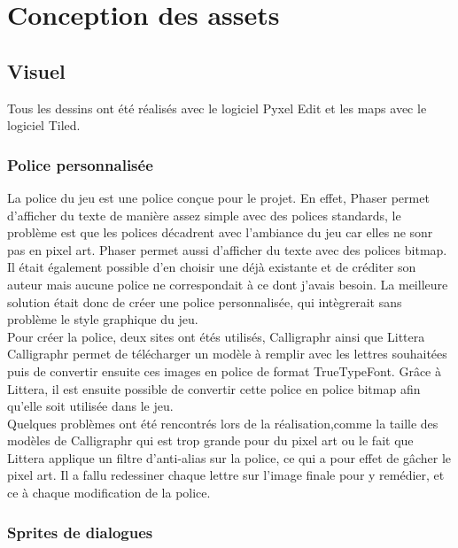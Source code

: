 \documentclass[11pt]{article}
\begin{document}
\section{Conception des assets}
\subsection{Visuel}
Tous les dessins ont été réalisés avec le logiciel Pyxel Edit et les maps avec le logiciel Tiled.
\subsubsection{Police personnalisée}
La police du jeu est une police conçue pour le projet. En effet, Phaser permet d'afficher du texte de manière assez simple avec des polices standards, le problème est que les polices décadrent avec l'ambiance du jeu car elles ne sonr pas en pixel art. Phaser permet aussi d'afficher du texte avec des polices bitmap. Il était également possible d'en choisir une déjà existante et de créditer son auteur mais aucune police ne correspondait à ce dont j'avais besoin. La meilleure solution était donc de créer une police personnalisée, qui intègrerait sans problème le style graphique du jeu. \\

Pour créer la police, deux sites ont étés utilisés, Calligraphr ainsi que Littera\\ Calligraphr permet de télécharger un modèle à remplir avec les lettres souhaitées puis de convertir ensuite ces images en police de format TrueTypeFont. Grâce à Littera, il est ensuite possible de convertir cette police en police bitmap afin qu'elle soit utilisée dans le jeu.\\

Quelques problèmes ont été rencontrés lors de la réalisation,comme la taille des modèles de Calligraphr qui est trop grande pour du pixel art ou le fait que Littera applique un filtre d'anti-alias sur la police, ce qui a pour effet de gâcher le pixel art. Il a fallu redessiner chaque lettre sur l'image finale pour y remédier, et ce à chaque modification de la police.
\subsubsection{Sprites de dialogues}
\end{document}
